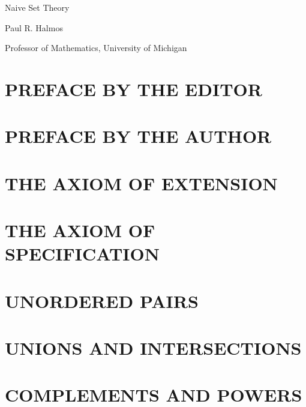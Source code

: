 \documentclass[fontsize=12pt,b5paper,
pagesize=auto]{book}
\theoremstyle{axiom}
\theoremstyle{exc}
\begin{document}
\begin{titlepage}
 \vspace*{1cm}
 {\huge\raggedright Naive Set Theory\par}
 \noindent\hrulefill\par
 {\LARGE\raggedleft Paul R. Halmos\textsuperscript{\textdagger}\par}
 \vfill
 {\Large\raggedright\textsuperscript{\textdagger}Professor of Mathematics, University of Michigan\par}
\end{titlepage}

\setlength{\headheight}{14.49998pt}

\chapter*{PREFACE BY THE EDITOR} 


\chapter*{PREFACE BY THE AUTHOR} 


\tableofcontents

\chapter{THE AXIOM OF EXTENSION}


\chapter{THE AXIOM OF SPECIFICATION}


\chapter{UNORDERED PAIRS}


\chapter{UNIONS AND INTERSECTIONS}


\chapter{COMPLEMENTS AND POWERS} 

\end{document}
